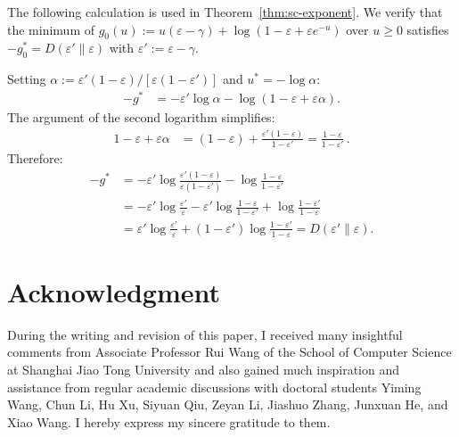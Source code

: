 \documentclass[journal]{IEEEtran}
\numberwithin{equation}{section}
\begin{document}
The following calculation is used in
Theorem~\ref{thm:sc-exponent}.
We verify that the minimum of
$g_0(u):=u(\varepsilon{-}\gamma)
+\log(1{-}\varepsilon{+}\varepsilon e^{-u})$
over $u\ge 0$ satisfies $-g_0^*=D(\varepsilon'\|\varepsilon)$
with $\varepsilon':=\varepsilon{-}\gamma$.

Setting $\alpha:=\varepsilon'(1{-}\varepsilon)/
[\varepsilon(1{-}\varepsilon')]$ and $u^*=-\log\alpha$:
\begin{align*}
  -g^*
  &=-\varepsilon'\log\alpha
    -\log(1{-}\varepsilon{+}\varepsilon\alpha).
\end{align*}
The argument of the second logarithm simplifies:
\begin{align*}
  1{-}\varepsilon{+}\varepsilon\alpha
  &=(1{-}\varepsilon)
    +\frac{\varepsilon'(1{-}\varepsilon)}
          {1{-}\varepsilon'}
  =\frac{1{-}\varepsilon}{1{-}\varepsilon'}\,.
\end{align*}
Therefore:
\begin{align*}
  -g^*
  &=-\varepsilon'\log
    \frac{\varepsilon'(1{-}\varepsilon)}
         {\varepsilon(1{-}\varepsilon')}
    -\log\frac{1{-}\varepsilon}{1{-}\varepsilon'}\\
  &=-\varepsilon'\log\frac{\varepsilon'}{\varepsilon}
    -\varepsilon'\log\frac{1{-}\varepsilon}{1{-}\varepsilon'}
    +\log\frac{1{-}\varepsilon'}{1{-}\varepsilon}\\
  &=\varepsilon'\log\frac{\varepsilon'}{\varepsilon}
    +(1{-}\varepsilon')\log\frac{1{-}\varepsilon'}
                              {1{-}\varepsilon}
  =D(\varepsilon'\|\varepsilon).
\end{align*}


\section*{Acknowledgment}

During the writing and revision of this paper, I received many insightful comments from Associate Professor Rui Wang of the School of Computer Science at Shanghai Jiao Tong University and also gained much inspiration and assistance from regular academic discussions with doctoral students Yiming Wang, Chun Li, Hu Xu, Siyuan Qiu, Zeyan Li, Jiashuo Zhang, Junxuan He, and Xiao Wang. I hereby express my sincere gratitude to them.







\vfill
\end{document}
